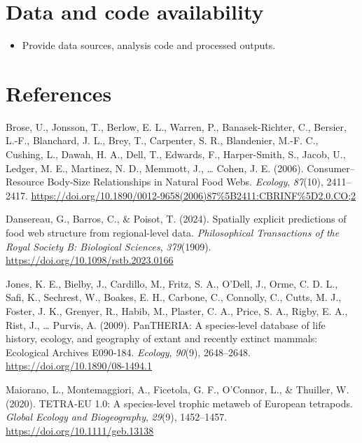 \documentclass[
]{article}
\newlength{\cslhangindent}
\newenvironment{CSLReferences}[2] %
 {\begin{list}{}{%
  \setlength{\itemindent}{0pt}
  \setlength{\leftmargin}{0pt}
  \setlength{\parsep}{0pt}
  \ifodd #1
   \setlength{\leftmargin}{\cslhangindent}
   \setlength{\itemindent}{-1\cslhangindent}
  \fi
  \setlength{\itemsep}{#2\baselineskip}}}
 {\end{list}}
\providecommand{\tightlist}{%
  \setlength{\itemsep}{0pt}\setlength{\parskip}{0pt}}
\begin{document}
\section{Data and code availability}\label{data-and-code-availability}

\begin{itemize}
\tightlist
\item
  Provide data sources, analysis code and processed outputs.
\end{itemize}

\section*{References}\label{references}

\protect{}\label{refs}
\begin{CSLReferences}{1}{0}
Brose, U., Jonsson, T., Berlow, E. L., Warren, P., Banasek-Richter, C.,
Bersier, L.-F., Blanchard, J. L., Brey, T., Carpenter, S. R.,
Blandenier, M.-F. C., Cushing, L., Dawah, H. A., Dell, T., Edwards, F.,
Harper-Smith, S., Jacob, U., Ledger, M. E., Martinez, N. D., Memmott,
J., \ldots{} Cohen, J. E. (2006). Consumer--{Resource Body-Size
Relationships} in {Natural Food Webs}. \emph{Ecology}, \emph{87}(10),
2411--2417.
\url{https://doi.org/10.1890/0012-9658(2006)87\%5B2411:CBRINF\%5D2.0.CO;2}

Dansereau, G., Barros, C., \& Poisot, T. (2024). Spatially explicit
predictions of food web structure from regional-level data.
\emph{Philosophical Transactions of the Royal Society B: Biological
Sciences}, \emph{379}(1909).
\url{https://doi.org/10.1098/rstb.2023.0166}

Jones, K. E., Bielby, J., Cardillo, M., Fritz, S. A., O'Dell, J., Orme,
C. D. L., Safi, K., Sechrest, W., Boakes, E. H., Carbone, C., Connolly,
C., Cutts, M. J., Foster, J. K., Grenyer, R., Habib, M., Plaster, C. A.,
Price, S. A., Rigby, E. A., Rist, J., \ldots{} Purvis, A. (2009).
{PanTHERIA}: A species‐level database of life history, ecology, and
geography of extant and recently extinct mammals: {Ecological Archives
E090}‐184. \emph{Ecology}, \emph{90}(9), 2648--2648.
\url{https://doi.org/10.1890/08-1494.1}

Maiorano, L., Montemaggiori, A., Ficetola, G. F., O'Connor, L., \&
Thuiller, W. (2020). {TETRA}‐{EU} 1.0: {A} species‐level trophic metaweb
of {European} tetrapods. \emph{Global Ecology and Biogeography},
\emph{29}(9), 1452--1457. \url{https://doi.org/10.1111/geb.13138}


\end{CSLReferences}
\end{document}
